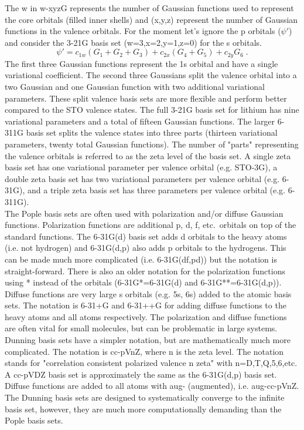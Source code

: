 \documentclass[12pt]{report}
\begin{document}
The w in w-xyzG represents the number of Gaussian functions used to represent
the core orbitals (filled inner shells) and (x,y,z) represent the number of
Gaussian functions in the valence orbitals. For the moment let's ignore the p
orbitals ($\psi'$) and consider the 3-21G basis set (w=3,x=2,y=1,z=0) for the
s orbitals.
\begin{equation}
 \psi' = c_{1w}(G_1+G_2+G_3)+c_{2x}(G_4+G_5)+c_{2y}G_6 \; .
\end{equation}
The first three Gaussian functions represent the 1s orbital and have a single
variational coefficient. The second three Gaussians split the valence orbital
into a two Gaussian and one Gaussian function with two additional variational
parameters. These split valence basis sets are more flexible and perform
better compared to the STO valence states. The full 3-21G basis set for
lithium has nine variational parameters and a total of fifteen Gaussian
functions. The larger 6-311G basis set splits the valence states into three
parts (thirteen variational parameters, twenty total Gaussian functions). The
number of "parts" representing the valence orbitals is referred to as the zeta
level of the basis set. A single zeta basis set has one variational parameter
per valence orbital (e.g. STO-3G), a double zeta basis set has two variational
parameters per valence orbital (e.g. 6-31G), and a triple zeta basis set has
three parameters per valence orbital (e.g. 6-311G). \\

The Pople basis sets are often used with polarization and/or diffuse Gaussian
functions. Polarization functions are additional p, d, f, etc.\ orbitals on
top of the standard functions. The 6-31G(d) basis set adds d orbitals to the
heavy atoms (i.e. not hydrogen) and 6-31G(d,p) also adds p orbitals to the
hydrogens. This can be made much more complicated (i.e. 6-31G(df,pd)) but the
notation is straight-forward. There is also an older notation for the
polarization functions using * instead of the orbitals (6-31G*=6-31G(d) and
6-31G**=6-31G(d,p)). Diffuse functions are very large s orbitals (e.g. 5s, 6s)
added to the atomic basis sets. The notation is 6-31+G and 6-31++G for adding
diffuse functions to the heavy atoms and all atoms respectively. The
polarization and diffuse functions are often vital for small molecules, but
can be problematic in large systems. \\

Dunning basis sets have a simpler notation, but are mathematically much more
complicated. The notation is cc-pVnZ, where n is the zeta level. The notation
stands for "correlation consistent polarized valence n zeta" with
n=D,T,Q,5,6,etc. A cc-pVDZ basis set is approximately the same as the
6-31G(d,p) basis set. Diffuse functions are added to all atoms with aug-
(augmented), i.e. aug-cc-pVnZ. The Dunning basis sets are designed to
systematically converge to the infinite basis set, however, they are much more
computationally demanding than the Pople basis sets.
\end{document}

